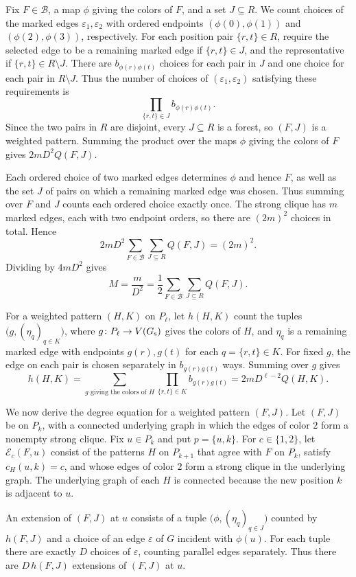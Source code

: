 \documentclass[preprint,11pt,numbers]{elsarticle-arxiv}
\numberwithin{equation}{section}
\theoremstyle{definition}
\begin{document}
Fix $F\in\mathcal B$, a map $\phi$ giving the colors of $F$, and a
set $J\subseteq R$. We count choices of the marked edges
$\varepsilon_1,\varepsilon_2$ with ordered endpoints
$(\phi(0),\phi(1))$ and $(\phi(2),\phi(3))$, respectively. For each
position pair $\{r,t\}\in R$, require the selected edge to be a
remaining marked edge if $\{r,t\}\in J$, and the representative if
$\{r,t\}\in R\setminus J$. There are $b_{\phi(r)\phi(t)}$ choices
for each pair in $J$ and one choice for each pair in $R\setminus J$.
Thus the number of choices of $(\varepsilon_1,\varepsilon_2)$
satisfying these requirements is
\[
 \prod_{\{r,t\}\in J} b_{\phi(r)\phi(t)}.
\]
Since the two pairs in $R$ are disjoint, every $J\subseteq R$ is a
forest, so $(F,J)$ is a weighted pattern. Summing the product over
the maps $\phi$ giving the colors of $F$ gives $2mD^2Q(F,J)$.

Each ordered choice of two marked edges determines $\phi$ and
hence $F$, as well as the set $J$ of pairs on which a remaining
marked edge was chosen. Thus summing over $F$ and $J$ counts each
ordered choice exactly once. The strong clique has $m$ marked
edges, each with two endpoint orders, so there are $(2m)^2$
choices in total. Hence
\[
 2mD^2\sum_{F\in\mathcal B}\sum_{J\subseteq R} Q(F,J)=(2m)^2.
\]
Dividing by $4mD^2$ gives
\[
 M=\frac{m}{D^2}=\frac{1}{2}
   \sum_{F\in\mathcal B}\sum_{J\subseteq R}Q(F,J).
\]

For a weighted pattern $(H,K)$ on $P_\ell$, let $h(H,K)$ count
the tuples $\bigl(g,(\eta_q)_{q\in K}\bigr)$, where
$g\colon P_\ell\to V(G_{\rm s})$ gives the colors of $H$, and
$\eta_q$ is a remaining marked edge with endpoints $g(r),g(t)$
for each $q=\{r,t\}\in K$. For fixed $g$, the edge on each pair
is chosen separately in $b_{g(r)g(t)}$ ways. Summing over $g$ gives
\[
 h(H,K)=\sum_{g\text{ giving the colors of }H}
  \prod_{\{r,t\}\in K} b_{g(r)g(t)}=2mD^{\ell-2}Q(H,K).
\]

We now derive the degree equation for a weighted pattern $(F,J)$.
Let $(F,J)$ be on $P_k$, with a connected underlying graph in
which the edges of color $2$ form a nonempty strong clique.
Fix $u\in P_k$ and put $p=\{u,k\}$. For $c\in\{1,2\}$,
let $\mathcal E_c(F,u)$ consist of the patterns $H$ on $P_{k+1}$
that agree with $F$ on $P_k$, satisfy $c_H(u,k)=c$, and whose edges
of color $2$ form a strong clique in the underlying graph. The
underlying graph of each $H$ is connected because the new
position $k$ is adjacent to $u$.

An extension of $(F,J)$ at $u$ consists of a tuple
$\bigl(\phi,(\eta_q)_{q\in J}\bigr)$ counted by $h(F,J)$ and a choice
of an edge $\varepsilon$ of $G$ incident with $\phi(u)$. For each
tuple there are exactly $D$ choices of $\varepsilon$, counting
parallel edges separately. Thus there are $D\,h(F,J)$ extensions
of $(F,J)$ at $u$.
\end{document}
